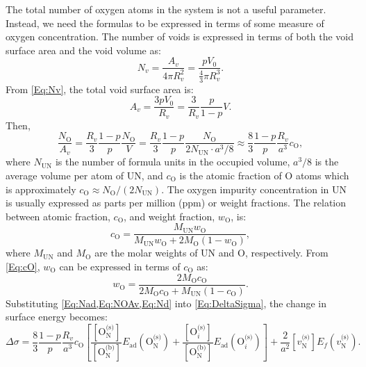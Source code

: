 \documentclass[preprint,12pt,sort&compress]{elsarticle}
\newcommand{\?}{\stackrel{?}{=}}
\begin{document}
The total number of oxygen atoms in the system is not a useful parameter. Instead, we need the formulas to be expressed in terms of some measure of oxygen concentration. The number of voids is expressed in terms of both the void surface area and the void volume as:
\begin{equation}
N_v = \frac{A_v}{4 \pi R_v^2} = \frac{ p V_0 }{ \frac{4}{3} \pi R_v^3 }.
\label{Eq:Nv}
\end{equation}
From \cref{Eq:Nv}, the total void surface area is:
\begin{equation}
A_v = \frac{3 p V_0}{R_v} = \frac{3}{R_v} \frac{p}{1-p} V.
\label{Eq:Av}
\end{equation}
Then,
\begin{equation}
\frac {N_\text{O}} {A_v} = \frac {R_v} {3} \frac{1-p} {p} \frac {N_\text{O}} {V} = \frac {R_v} {3} \frac{1-p} {p} \frac {N_\text{O}} { 2 N_\text{UN} \cdot a^3/8 } \approx \frac{8}{3} \frac{1-p}{p} \frac{R_v}{a^3} c_\text{O}, 
\label{Eq:NOAv}
\end{equation}
where $N_\text{UN}$ is the number of formula units in the occupied volume, $a^3/8$ is the average volume per atom of UN, and $c_\text{O}$ is the atomic fraction of O atoms which is approximately $c_\text{O} \approx N_\text{O}/( 2N_\text{UN})$. The oxygen impurity concentration in UN is usually expressed as parts per million (ppm) or weight fractions. The relation between atomic fraction, $c_\text{O}$, and weight fraction, $w_\text{O}$, is:
\begin{equation}
c_\text{O} = \frac { M_\text{UN} w_\text{O} } { M_\text{UN} w_\text{O} + 2 M_\text{O} ( 1 - w_\text{O} ) },
\label{Eq:cO}
\end{equation}
where $M_\text{UN}$ and $M_\text{O}$ are the molar weights of UN and O, respectively. From \cref{Eq:cO}, $w_\text{O}$ can be expressed in terms of $c_\text{O}$ as:
\begin{equation}
w_\text{O} = \frac{ 2 M_\text{O} c_\text{O} }{ 2 M_\text{O} c_\text{O} + M_\text{UN} ( 1 - c_\text{O} ) }.
\end{equation}
Substituting \cref{Eq:Nad,Eq:NOAv,Eq:Nd} into \cref{Eq:DeltaSigma}, the change in surface energy becomes:
\begin{equation}
\Delta \sigma = \frac{8}{3} \frac{1-p}{p} \frac{R_v}{a^3} c_\text{O} \left[ \frac{ [ \text{O}_\text{N}^{\text{(s)}} ] }{ [ \text{O}_\text{N}^{\text{(b)}} ] }  E_\text{ad}( \text{O}_\text{N}^{\text{(s)}} ) + \frac{ [ \text{O}_i^{\text{(s)}} ] }{ [ \text{O}_\text{N}^{\text{(b)}} ] }  E_\text{ad}( \text{O}_i^{\text{(s)}} ) \right] + \frac{2}{a^2} [ v_\text{N}^{\text{(s)}} ] E_f ( v_\text{N}^{\text{(s)}} ).
\end{equation}
\end{document}
